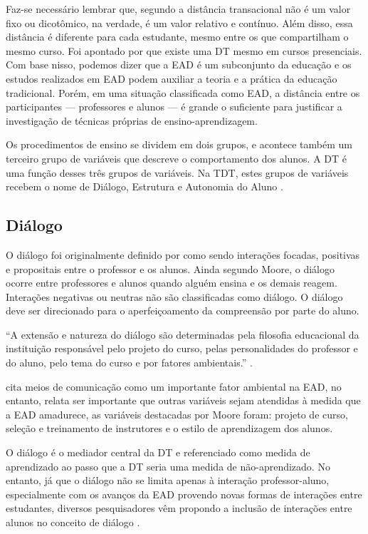 Faz-se necessário lembrar que, segundo  a distância
transacional não é um valor fixo ou dicotômico, na verdade, é um valor relativo
e contínuo. Além disso, essa distância é diferente para cada estudante, mesmo
entre os que compartilham o mesmo curso. Foi apontado por
 que existe uma DT mesmo em cursos presenciais.
Com base nisso, podemos dizer que a EAD é um subconjunto da educação e os
estudos realizados em EAD podem auxiliar a teoria e a prática da educação
tradicional. Porém, em uma situação classificada como EAD, a distância entre os
participantes --- professores e alunos --- é grande o suficiente para justificar
a investigação de técnicas próprias de ensino-aprendizagem.

Os procedimentos de ensino se dividem em dois grupos, e acontece também um
terceiro grupo de variáveis que descreve o comportamento dos alunos. A DT é uma
função desses três grupos de variáveis. Na TDT, estes grupos de variáveis
recebem o nome de Diálogo, Estrutura e Autonomia do Aluno
\cite{moore2008teoria}.

\subsection{Diálogo}

O diálogo foi originalmente definido por  como
sendo interações focadas, positivas e propositais entre o professor e os alunos.
Ainda segundo Moore, o diálogo ocorre entre professores e alunos quando alguém
ensina e os demais reagem. Interações negativas ou neutras não são classificadas
como diálogo. O diálogo deve ser direcionado para o aperfeiçoamento da
compreensão por parte do aluno.

``A extensão e natureza do diálogo são determinadas pela filosofia educacional
da instituição responsável pelo projeto do curso, pelas personalidades do
professor e do aluno, pelo tema do curso e por fatores ambientais.''
\cite[p.~438]{cabau2018teoria}.

 cita meios de comunicação como um importante
fator ambiental na EAD, no entanto, relata ser importante que outras variáveis
sejam atendidas à medida que a EAD amadurece, as variáveis destacadas por Moore
foram: projeto de curso, seleção e treinamento de instrutores e o estilo de
aprendizagem dos alunos.

O diálogo é o mediador central da DT e referenciado como medida de aprendizado
ao passo que a DT seria uma medida de não-aprendizado. No entanto, já que o
diálogo não se limita apenas à interação professor-aluno, especialmente com os
avanços da EAD provendo novas formas de interações entre estudantes, diversos
pesquisadores vêm propondo a inclusão de interações entre alunos no conceito de
diálogo \cite{benson2009addressing,chen1999dimensions,huang2016understanding}.

